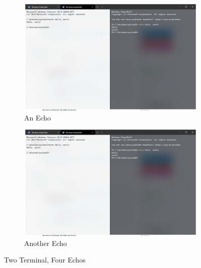 \documentclass{article}
\begin{document}
\begin{figure}[!ht]
    \centering
    \begin{subfigure}[b]{0.4\linewidth}
        \includegraphics[width=\linewidth]{echos.jpg}
        \caption{An Echo}
    \end{subfigure}
    \begin{subfigure}[b]{0.4\linewidth}
        \includegraphics[width=\linewidth]{echos.jpg}
        \caption{Another Echo}
    \end{subfigure}
    \caption{Two Terminal, Four Echos}
    \label{fig:TwoTerminal_random1}
\end{figure}
\end{document}
